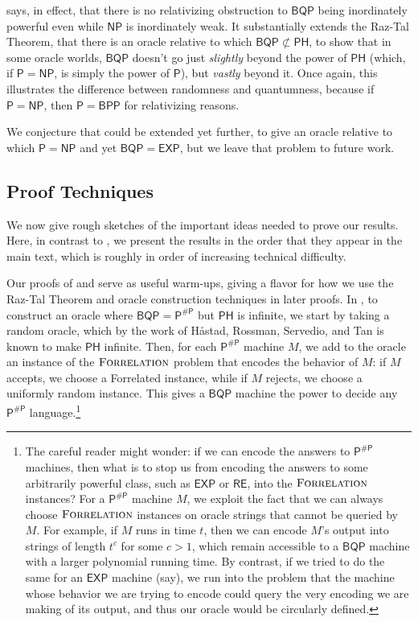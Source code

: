 \documentclass[11pt]{article}%
\newcommand{\Forrelation}{\normalfont\textsc{Forrelation}}
\begin{document}
 says, in effect, that there is no relativizing obstruction to $\mathsf{BQP}$ being inordinately powerful even while $\mathsf{NP}$ is inordinately weak. It substantially extends the Raz-Tal Theorem, that there is an oracle relative to which $\mathsf{BQP} \not\subset \mathsf{PH}$, to show that in some oracle worlds, $\mathsf{BQP}$ doesn't go just \textit{slightly} beyond the power of $\mathsf{PH}$ (which,
if $\mathsf{P} = \mathsf{NP}$, is simply the power of $\mathsf{P}$), but \textit{vastly} beyond it. Once again, this illustrates the difference between randomness and quantumness, because if $\mathsf{P} = \mathsf{NP}$, then $\mathsf{P} = \mathsf{BPP}$ for relativizing reasons.

We conjecture that  could be extended yet further, to give an oracle relative to which $\mathsf{P} = \mathsf{NP}$ and yet $\mathsf{BQP} = \mathsf{EXP}$, but we leave that problem to future work.

\subsection{Proof Techniques}

We now give rough sketches of the important ideas needed to prove our results. Here, in contrast to , we present the results in the order that they appear in the main text, which is roughly in order of increasing technical difficulty.

Our proofs of  and  serve as useful warm-ups, giving a flavor for how we use the Raz-Tal Theorem and oracle construction techniques in later proofs. In , to construct an oracle where $\mathsf{BQP} = \mathsf{P^{\# P}}$ but $\mathsf{PH}$ is infinite, we start by taking a random oracle, which by the work of H\r{a}stad, Rossman, Servedio, and Tan \cite{HRST17, RST15} is known to make $\mathsf{PH}$ infinite. Then, for each $\mathsf{P^{\# P}}$ machine $M$, we add to the oracle an instance of the $\Forrelation$ problem that encodes the behavior of $M$: if $M$ accepts, we choose a Forrelated instance, while if $M$ rejects, we choose a uniformly random instance. This gives a $\mathsf{BQP}$ machine the power to decide any $\mathsf{P^{\# P}}$ language.\footnote{The careful reader might wonder: if we can encode the answers to $\mathsf{P^{\# P}}$ machines, then what is to stop us from encoding the answers to some arbitrarily powerful class, such as $\mathsf{EXP}$ or $\mathsf{RE}$, into the $\Forrelation$ instances? For a $\mathsf{P^{\# P}}$ machine $M$, we exploit the fact that we can always choose $\Forrelation$ instances on oracle strings that cannot be queried by $M$. For example, if $M$ runs in time $t$, then we can encode $M$'s output into strings of length $t^c$ for some $c > 1$, which remain accessible to a $\mathsf{BQP}$ machine with a larger polynomial running time. By contrast, if we tried to do the same for an $\mathsf{EXP}$ machine (say), we run into the problem that the machine whose behavior we are trying to encode could query the very encoding we are making of its output, and thus our oracle would be circularly defined.}
\end{document}
